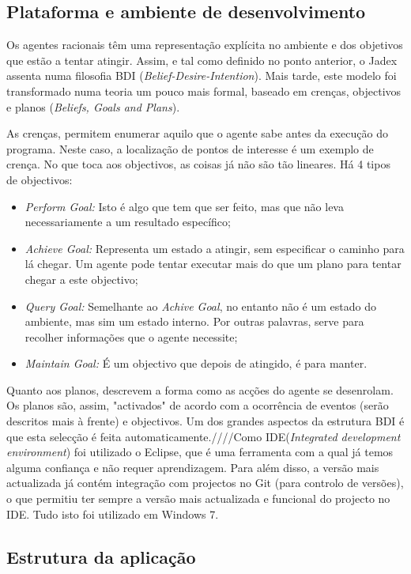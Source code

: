 \documentclass[15pt,a4paper]{article}
\begin{document}
\subsection{Plataforma e ambiente de desenvolvimento}
Os agentes racionais têm uma representação explícita no ambiente e dos objetivos que estão a tentar atingir. Assim, e tal como definido no ponto anterior, o Jadex assenta numa filosofia BDI (\textit{Belief-Desire-Intention}). Mais tarde, este modelo foi transformado numa teoria um pouco mais formal, baseado em crenças, objectivos e planos (\textit{Beliefs, Goals and Plans}).

As crenças, permitem enumerar aquilo que o agente sabe antes da execução do programa. Neste caso, a localização de pontos de interesse é um exemplo de crença.
No que toca aos objectivos, as coisas já não são tão lineares. Há 4 tipos de objectivos:
\begin{itemize}
  \item \textit{Perform Goal:} Isto é algo que tem que ser feito, mas que não leva necessariamente a um resultado específico;
  \item \textit{Achieve Goal:} Representa um estado a atingir, sem especificar o caminho para lá chegar. Um agente pode tentar executar mais do que um plano para tentar chegar a este objectivo;
  \item \textit{Query Goal:} Semelhante ao \textit{Achive Goal}, no entanto não é um estado do ambiente, mas sim um estado interno. Por outras palavras, serve para recolher informações que o agente necessite;
  \item \textit{Maintain Goal:} É um objectivo que depois de atingido, é para manter.
\end{itemize}
Quanto aos planos, descrevem a forma como as acções do agente se desenrolam. Os planos são, assim, "activados" de acordo com a ocorrência de eventos (serão descritos mais à frente) e objectivos. Um dos grandes aspectos da estrutura BDI é que esta selecção é feita automaticamente.////Como IDE(\textit{Integrated development environment}) foi utilizado o Eclipse, que é uma ferramenta com a qual já temos alguma confiança e não requer aprendizagem. Para além disso, a versão mais actualizada já contém integração com projectos no Git (para controlo de versões), o que permitiu ter sempre a versão mais actualizada e funcional do projecto no IDE. Tudo isto foi utilizado em Windows 7.
 
\subsection{Estrutura da aplicação}
\end{document}
